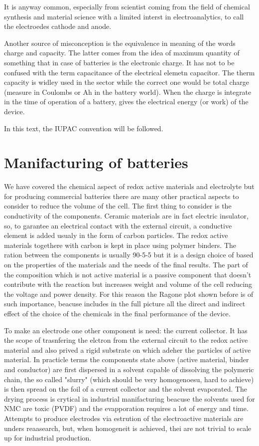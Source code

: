 It is anyway common, especially from scientist coming from the field of chemical synthesis and material science with a limited interst in electroanalytics, to call the electroedes cathode and anode. 

Another source of misconception is the equivalence in meaning of the words charge and capacity. The latter comes from the idea of maximum quantity of something that in case of batteries is the electronic charge. It has not to be confused with the term capacitance of the electrical elemetn capacitor. The therm capacity is widley used in the sector while the correct one would be total charge (measure in Coulombs or Ah in the battery world). When the charge is integrate in the time of operation of a battery, gives the electrical energy (or work) of the device.

In this text, the IUPAC convention will be followed.

\section{Manifacturing of batteries}

We have covered the chemical aspect of redox active materials and electrolyte but for producing commercial batteries there are many other practical aspects to consider to reduce the volume of the cell. 
The first thing to consider is the conductivity of the components. Ceramic materials are in fact electric insulator, so, to garantee an electrical contact with the external circuit, a conductive element is added usualy in the form of carbon particles. The redox active materials togethere with carbon is kept in place using polymer binders. The ration between the components is usually 90-5-5 but it is a design choice of based on the properties of the materials and the needs of the final results. The part of the composition which is not active material is a passive component that doesn't contribute with the reaction but increases weight and volume of the cell reducing the voltage and power density. For this reason the Ragone plot shown before is of such importance, beacuse includes in the full picture all the direct and indirect effect of the choice of the chemicals in the final performance of the device.

To make an electrode one other component is need: the current collector. It has the scope of trasnfering the elctron from the external circuit to the redox active material and also prived a rigid substrate on which adeher the particles of active material. In practicle terms the components state above (active material, binder and conductor) are first dispersed in a solvent capable of dissolving the polymeric chain, the so called "slurry" (which should be very homogenoesu, hard to achieve) is then spread on the foil of a current collector and the solvent evaporated. The drying process is crytical in industrial manifacturing beacuse the solvents used for NMC are toxic (PVDF) and the evapporation requires a lot of energy and time. Attempts to produce electrodes via estrution of the electroactive materials are unders reaasearch, but, when homogeneit is achieved, thei are not trivial to scale up for industrial production. 

